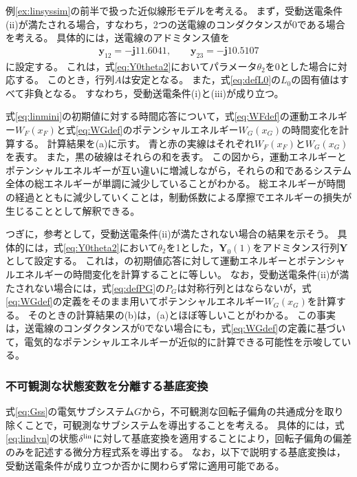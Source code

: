 \documentclass[tombow,dvipdfmx]{corona-a5-1.1}
\begin{document}
\begin{例}[蓄積されるエネルギーの時間変化]\label{ex:energylin}
例\ref{ex:linsyssim}の前半で扱った近似線形モデルを考える。
まず，受動送電条件(ii)が満たされる場合，すなわち，2つの送電線のコンダクタンスが0である場合を考える。
具体的には，送電線のアドミタンス値を
\begin{align}\label{eq:bothlossless}
\bm{y}_{12} = - \bm{j} 11.6041, \qquad
\bm{y}_{23} =  - \bm{j} 10.5107
\end{align}
に設定する。
これは，式\ref{eq:Y0theta2}においてパラメータ$\theta_2$を0とした場合に対応する。
このとき，行列$A$は安定となる。
また，式\ref{eq:defL0}の$L_0$の固有値はすべて非負となる。
すなわち，受動送電条件(i)と(iii)が成り立つ。

式\ref{eq:linmini}の初期値に対する時間応答について，式\ref{eq:WFdef}の運動エネルギー$W_F(x_F)$と式\ref{eq:WGdef}のポテンシャルエネルギー$W_G(x_G)$の時間変化を計算する。
計算結果を(a)に示す。
青と赤の実線はそれぞれ$W_F(x_F)$と$W_G(x_G)$を表す。
また，黒の破線はそれらの和を表す。
この図から，運動エネルギーとポテンシャルエネルギーが互い違いに増減しながら，それらの和であるシステム全体の総エネルギーが単調に減少していることがわかる。
総エネルギーが時間の経過とともに減少していくことは，制動係数による摩擦でエネルギーの損失が生じることとして解釈できる。

つぎに，参考として，受動送電条件(ii)が満たされない場合の結果を示そう。
具体的には，式\ref{eq:Y0theta2}において$\theta_2$を1とした，$\bm{Y}_0(1)$をアドミタンス行列$\bm{Y}$として設定する。
これは，の初期値応答に対して運動エネルギーとポテンシャルエネルギーの時間変化を計算することに等しい。
なお，受動送電条件(ii)が満たされない場合には，式\ref{eq:defPG}の$P_G$は対称行列とはならないが，式\ref{eq:WGdef}の定義をそのまま用いてポテンシャルエネルギー$W_G(x_G)$を計算する。
そのときの計算結果の(b)は，(a)とほぼ等しいことがわかる。
この事実は，送電線のコンダクタンスが0でない場合にも，式\ref{eq:WGdef}の定義に基づいて，電気的なポテンシャルエネルギーが近似的に計算できる可能性を示唆している。
\end{例}

\smallskip
\subsubsection{不可観測な状態変数を分離する基底変換}

式\ref{eq:Gss}の電気サブシステム$G$から，不可観測な回転子偏角の共通成分を取り除くことで，可観測なサブシステムを導出することを考える。
具体的には，式\ref{eq:lindyn}の状態$\delta^{\rm lin}$に対して基底変換を適用することにより，回転子偏角の偏差のみを記述する微分方程式系を導出する。
なお，以下で説明する基底変換は，受動送電条件が成り立つか否かに関わらず常に適用可能である。
\end{document}
